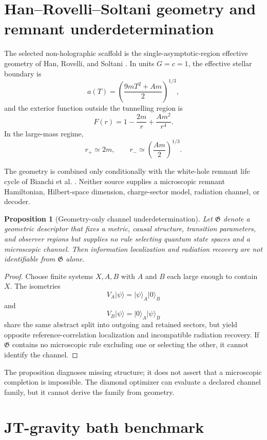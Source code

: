 \documentclass[11pt]{article}
\newtheorem{proposition}{Proposition}
\begin{document}
\section{Han--Rovelli--Soltani geometry and remnant underdetermination}
\label{sec:hrs}

The selected non-holographic scaffold is the single-asymptotic-region effective geometry of Han, Rovelli, and Soltani \citep{HanRovelliSoltani2023}. In units $G=c=1$, the effective stellar boundary is
\[
a(T)=\left(\frac{9mT^2+Am}{2}\right)^{1/3},
\]
and the exterior function outside the tunnelling region is
\[
F(r)=1-\frac{2m}{r}+\frac{Am^2}{r^4}.
\]
In the large-mass regime,
\[
r_+\simeq2m,
\qquad
r_-\simeq\left(\frac{Am}{2}\right)^{1/3}.
\]

The geometry is combined only conditionally with the white-hole remnant life cycle of Bianchi et al. \citep{BianchiEtAl2018}. Neither source supplies a microscopic remnant Hamiltonian, Hilbert-space dimension, charge-sector model, radiation channel, or decoder.

\begin{proposition}[Geometry-only channel underdetermination]
Let $\mathfrak G$ denote a geometric descriptor that fixes a metric, causal structure, transition parameters, and observer regions but supplies no rule selecting quantum state spaces and a microscopic channel. Then information localization and radiation recovery are not identifiable from $\mathfrak G$ alone.
\end{proposition}

\begin{proof}
Choose finite systems $X,A,B$ with $A$ and $B$ each large enough to contain $X$. The isometries
\[
V_A|\psi\rangle=|\psi\rangle_A|0\rangle_B
\]
and
\[
V_B|\psi\rangle=|0\rangle_A|\psi\rangle_B
\]
share the same abstract split into outgoing and retained sectors, but yield opposite reference-correlation localization and incompatible radiation recovery. If $\mathfrak G$ contains no microscopic rule excluding one or selecting the other, it cannot identify the channel.
\end{proof}

The proposition diagnoses missing structure; it does not assert that a microscopic completion is impossible. The diamond optimizer can evaluate a declared channel family, but it cannot derive the family from geometry.

\section{JT-gravity bath benchmark}
\label{sec:jt}
\end{document}
